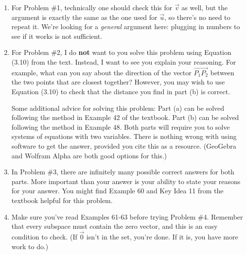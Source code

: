 \documentclass[letterpaper,12pt]{amsart}
\begin{document}
\begin{enumerate}
 \item For Problem \#1, technically one should check this for $\vec{v}$ as well, but the argument is exactly the same as the one used for $\vec{u}$, so there's no need to repeat it. We're looking for a \textit{general} argument here: plugging in numbers to see if it works is not sufficient.

\bigskip

 \item For Problem \#2, I do \textbf{not} want to you solve this problem using Equation (3.10) from the text. Instead, I want to see you explain your reasoning. For example, what can you say about the direction of the vector $\overrightarrow{P_1P_2}$ between the two points that are closest together? However, you may wish to use Equation (3.10) to check that the distance you find in part (b) is correct.

\medskip

 Some additional advice for solving this problem: Part (a) can be solved following the method in Example 42 of the textbook. Part (b) can be solved following the method in  Example 48. Both parts will require you to solve systems of equations with two variables. There is nothing wrong with using software to get the answer, provided you cite this as a resource. (GeoGebra and Wolfram Alpha are both good options for this.)

\bigskip

 \item In Problem \#3, there are infinitely many possible correct answers for both parts. More important than your answer is your ability to state your reasons for your answer. You might find Example 60 and Key Idea 11 from the textbook helpful for this problem.

\bigskip

 \item Make sure you've read Examples 61-63 before trying Problem \#4. Remember that every subspace must contain the zero vector, and this is an easy condition to check. (If $\vec{0}$ isn't in the set, you're done. If it is, you have more work to do.)
\end{enumerate}
\end{document}
